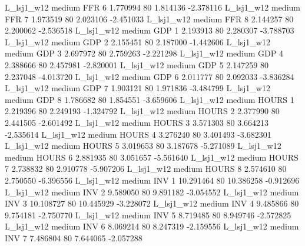     L_lsj1_w12     medium      FFR                 6  1.770994 80       1.814136          -2.378116
    L_lsj1_w12     medium      FFR                 7  1.973519 80       2.023106          -2.451033
    L_lsj1_w12     medium      FFR                 8  2.144257 80       2.200062          -2.536518
    L_lsj1_w12     medium      GDP                 1  2.193913 80       2.280307          -3.788703
    L_lsj1_w12     medium      GDP                 2  2.155451 80       2.187000          -1.442606
    L_lsj1_w12     medium      GDP                 3  2.697972 80       2.759263          -2.221298
    L_lsj1_w12     medium      GDP                 4  2.388666 80       2.457981          -2.820001
    L_lsj1_w12     medium      GDP                 5  2.147259 80       2.237048          -4.013720
    L_lsj1_w12     medium      GDP                 6  2.011777 80       2.092033          -3.836284
    L_lsj1_w12     medium      GDP                 7  1.903121 80       1.971836          -3.484799
    L_lsj1_w12     medium      GDP                 8  1.786682 80       1.854551          -3.659606
    L_lsj1_w12     medium    HOURS                 1  2.219396 80       2.249193          -1.324792
    L_lsj1_w12     medium    HOURS                 2  2.377990 80       2.441505          -2.601492
    L_lsj1_w12     medium    HOURS                 3  3.571303 80       3.664213          -2.535614
    L_lsj1_w12     medium    HOURS                 4  3.276240 80       3.401493          -3.682301
    L_lsj1_w12     medium    HOURS                 5  3.019653 80       3.187678          -5.271089
    L_lsj1_w12     medium    HOURS                 6  2.881935 80       3.051657          -5.561640
    L_lsj1_w12     medium    HOURS                 7  2.738832 80       2.910778          -5.907206
    L_lsj1_w12     medium    HOURS                 8  2.574610 80       2.750550          -6.396556
    L_lsj1_w12     medium      INV                 1 10.291464 80      10.386258          -0.912696
    L_lsj1_w12     medium      INV                 2  9.589050 80       9.891182          -3.054552
    L_lsj1_w12     medium      INV                 3 10.108727 80      10.445929          -3.228072
    L_lsj1_w12     medium      INV                 4  9.485866 80       9.754181          -2.750770
    L_lsj1_w12     medium      INV                 5  8.719485 80       8.949746          -2.572825
    L_lsj1_w12     medium      INV                 6  8.069214 80       8.247319          -2.159556
    L_lsj1_w12     medium      INV                 7  7.486804 80       7.644065          -2.057288
